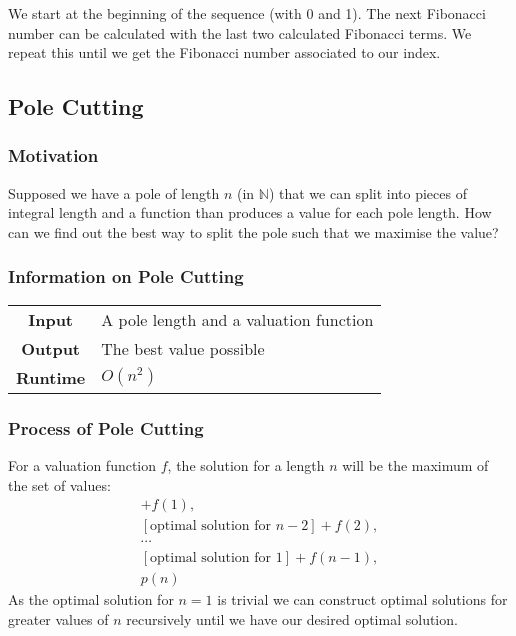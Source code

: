 \documentclass[a4paper, 12pt, twoside]{article}
\begin{document}
We start at the beginning of the sequence (with 0 and 1). The next 
Fibonacci number can be calculated with the last two calculated
Fibonacci terms. We repeat this until we get the Fibonacci number
associated to our index.

\newpage

\subsection{Pole Cutting}

\subsubsection{Motivation}

Supposed we have a pole of length $n$ (in $\mathbb{N}$) that we 
can split into pieces of integral length and a function
than produces a value for each pole length. How can we find out
the best way to split the pole such that we maximise the value?

\subsubsection{Information on Pole Cutting}

\begin{center}
      \begin{tabular}{ || c | p{8.5cm} || }
            \hline
                  \textbf{Input} & A pole length and a valuation
                        function \\
                  \textbf{Output} & The best value possible \\
            \hline\hline
                  \textbf{Runtime} & $O(n^2)$ \\
            \hline
      \end{tabular}
\end{center}

\subsubsection{Process of Pole Cutting}

For a valuation function $f$, the solution for a length $n$ will 
be the maximum of the set of values:
\begin{gather*}
      [\text{optimal solution for } n - 1] + f(1), \\
      [\text{optimal solution for } n - 2] + f(2), \\
      \cdots \\
      [\text{optimal solution for } 1] + f(n - 1), \\
      p(n)
\end{gather*}
As the optimal solution for $n = 1$ is trivial we can construct 
optimal solutions for greater values of $n$ recursively
until we have our desired optimal solution.
\end{document}

